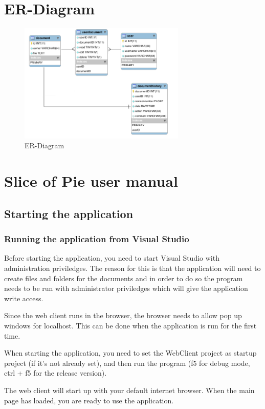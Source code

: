 \documentclass[11pt,a4paper]{article}
\begin{document}
\section{ER-Diagram}
	\begin{figure}[H]
  		\centering
    	\includegraphics[width=300px]{images/ER-Diagram.png}
    	\caption{ER-Diagram}
	\end{figure}
	
\section{Slice of Pie user manual}
\label{sec-1}
\subsection{Starting the application}
\label{sec-1-1}
\subsubsection{Running the application from Visual Studio}
\label{sec-1-1-1}

    Before starting the application, you need to start Visual Studio with administration priviledges.
    The reason for this is that the application will need to create files and folders for the documents
    and in order to do so the program needs to be run with administrator priviledges which will give the 
    application write access.

    Since the web client runs in the browser, the browser needs to allow pop up windows for localhost.
    This can be done when the application is run for the first time.

    When starting the application, you need to set the WebClient project as startup project (if it's not
    already set), and then run the program (f5 for debug mode, ctrl + f5 for the release version).

    The web client will start up with your default internet browser. 
    When the main page has loaded, you are ready to use the application.
\end{document}
